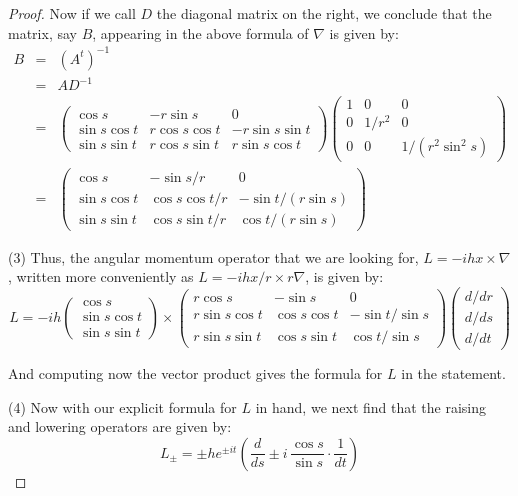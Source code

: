 \documentclass[12pt]{amsbook}
\begin{document}
\begin{proof}
Now if we call $D$ the diagonal matrix on the right, we conclude that the matrix, say $B$, appearing in the above formula of $\nabla$ is given by:
\begin{eqnarray*}
B
&=&(A^t)^{-1}\\
&=&AD^{-1}\\
&=&\begin{pmatrix}
\cos s&-r\sin s&0\\
\sin s\cos t&r\cos s\cos t&-r\sin s\sin t\\
\sin s\sin t&r\cos s\sin t&r\sin s\cos t
\end{pmatrix}
\begin{pmatrix}1&0&0\\ 0&1/r^2&0\\ 0&0&1/(r^2\sin^2s)\end{pmatrix}\\
&=&\begin{pmatrix}
\cos s&-\sin s/r&0\\
\sin s\cos t&\cos s\cos t/r&-\sin t/(r\sin s)\\
\sin s\sin t&\cos s\sin t/r&\cos t/(r\sin s)
\end{pmatrix}
\end{eqnarray*}

(3) Thus, the angular momentum operator that we are looking for, $L=-ihx\times\nabla$, written more conveniently as $L=-ihx/r\times r\nabla$, is given by:
$$L
=-ih
\begin{pmatrix}
\cos s\\
\sin s\cos t\\
\sin s\sin t
\end{pmatrix}\times
\begin{pmatrix}
r\cos s&-\sin s&0\\
r\sin s\cos t&\cos s\cos t&-\sin t/\sin s\\
r\sin s\sin t&\cos s\sin t&\cos t/\sin s
\end{pmatrix}
\begin{pmatrix}
d/dr\\
d/ds\\
d/dt
\end{pmatrix}$$

And computing now the vector product gives the formula for $L$ in the statement.

\medskip

(4) Now with our explicit formula for $L$ in hand, we next find that the raising and lowering operators are given by:
$$L_\pm=\pm he^{\pm it}\left(\frac{d}{ds}\pm i\,\frac{\cos s}{\sin s}\cdot\frac{1}{dt}\right)$$


\end{proof}
\end{document}

